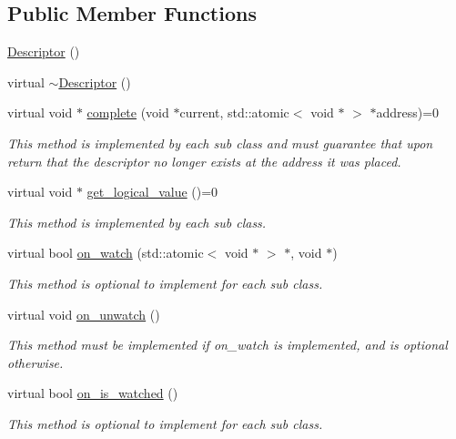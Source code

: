 \subsection*{Public Member Functions}
\begin{DoxyCompactItemize}
\item 
\hyperlink{classtervel_1_1util_1_1_descriptor_a1c05a0355d92fbf9e48fb3be3b7de6a8}{Descriptor} ()
\item 
virtual \hyperlink{classtervel_1_1util_1_1_descriptor_a40ea2f979d8502d3d467d1a9ed5d770d}{$\sim$\+Descriptor} ()
\item 
virtual void $\ast$ \hyperlink{classtervel_1_1util_1_1_descriptor_a4303b2a08e3ab67de5533cfb20db87c9}{complete} (void $\ast$current, std\+::atomic$<$ void $\ast$ $>$ $\ast$address)=0
\begin{DoxyCompactList}\small\item\em This method is implemented by each sub class and must guarantee that upon return that the descriptor no longer exists at the address it was placed. \end{DoxyCompactList}\item 
virtual void $\ast$ \hyperlink{classtervel_1_1util_1_1_descriptor_a5b443eeb6acf1207f27a6d06c39d4ad4}{get\+\_\+logical\+\_\+value} ()=0
\begin{DoxyCompactList}\small\item\em This method is implemented by each sub class. \end{DoxyCompactList}\item 
virtual bool \hyperlink{classtervel_1_1util_1_1_descriptor_ab643e09f20f35149dc820766b0f9ccdb}{on\+\_\+watch} (std\+::atomic$<$ void $\ast$ $>$ $\ast$, void $\ast$)
\begin{DoxyCompactList}\small\item\em This method is optional to implement for each sub class. \end{DoxyCompactList}\item 
virtual void \hyperlink{classtervel_1_1util_1_1_descriptor_ad383c66e9e773acdf1533d3735617519}{on\+\_\+unwatch} ()
\begin{DoxyCompactList}\small\item\em This method must be implemented if on\+\_\+watch is implemented, and is optional otherwise. \end{DoxyCompactList}\item 
virtual bool \hyperlink{classtervel_1_1util_1_1_descriptor_ac419167492f68c1dc9e8bd517efe5e16}{on\+\_\+is\+\_\+watched} ()
\begin{DoxyCompactList}\small\item\em This method is optional to implement for each sub class. \end{DoxyCompactList}\end{DoxyCompactItemize}
